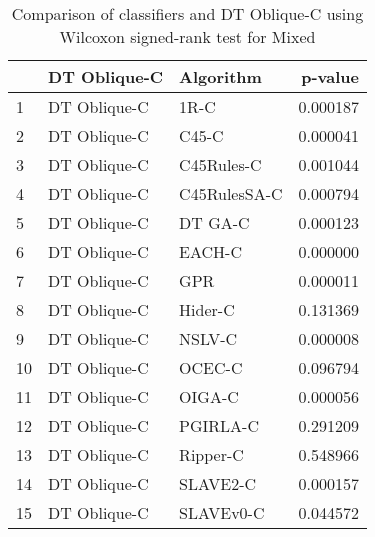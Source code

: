 \begin{table}
\footnotesize
\caption{Comparison of classifiers and DT Oblique-C using Wilcoxon signed-rank test for Mixed}
\label{tab:DT Oblique-C wilcoxon Mixed comparison}
\begin{tabular}{lllr}
\hline
 & DT Oblique-C & Algorithm & p-value \\
\hline
1 & DT Oblique-C & 1R-C & 0.000187 \\
2 & DT Oblique-C & C45-C & 0.000041 \\
3 & DT Oblique-C & C45Rules-C & 0.001044 \\
4 & DT Oblique-C & C45RulesSA-C & 0.000794 \\
5 & DT Oblique-C & DT GA-C & 0.000123 \\
6 & DT Oblique-C & EACH-C & 0.000000 \\
7 & DT Oblique-C & GPR & 0.000011 \\
8 & DT Oblique-C & Hider-C & 0.131369 \\
9 & DT Oblique-C & NSLV-C & 0.000008 \\
10 & DT Oblique-C & OCEC-C & 0.096794 \\
11 & DT Oblique-C & OIGA-C & 0.000056 \\
12 & DT Oblique-C & PGIRLA-C & 0.291209 \\
13 & DT Oblique-C & Ripper-C & 0.548966 \\
14 & DT Oblique-C & SLAVE2-C & 0.000157 \\
15 & DT Oblique-C & SLAVEv0-C & 0.044572 \\
\hline
\end{tabular}
\end{table}
